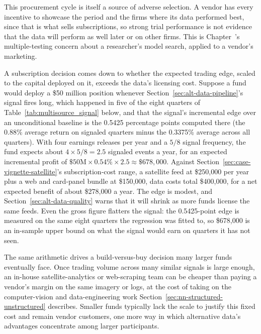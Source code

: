 \documentclass[../ai_in_finance]{subfiles}
\begin{document}
This procurement cycle is itself a source of adverse selection. A vendor has every incentive to showcase the period and the firms where its data performed best, since that is what sells subscriptions, so strong trial performance is not evidence that the data will perform as well later or on other firms. This is Chapter~'s multiple-testing concern about a researcher's model search, applied to a vendor's marketing.

A subscription decision comes down to whether the expected trading edge, scaled to the capital deployed on it, exceeds the data's licensing cost. Suppose a fund would deploy a \$50 million position whenever Section~\ref{sec:alt-data-pipeline}'s signal fires long, which happened in five of the eight quarters of Table~\ref{tab:multisource_signal} below, and that the signal's incremental edge over an unconditional baseline is the 0.5425 percentage points computed there (the 0.88\% average return on signaled quarters minus the 0.3375\% average across all quarters). With four earnings releases per year and a $5/8$ signal frequency, the fund expects about $4 \times 5/8 = 2.5$ signaled events a year, for an expected incremental profit of $\$50\text{M} \times 0.54\% \times 2.5 \approx \$678{,}000$. Against Section~\ref{sec:case-vignette-satellite}'s subscription-cost range, a satellite feed at \$250,000 per year plus a web and card-panel bundle at \$150,000, data costs total \$400,000, for a net expected benefit of about \$278,000 a year. The edge is modest, and Section~\ref{sec:alt-data-quality} warns that it will shrink as more funds license the same feeds. Even the gross figure flatters the signal: the 0.5425-point edge is measured on the same eight quarters the regression was fitted to, so \$678,000 is an in-sample upper bound on what the signal would earn on quarters it has not seen.

The same arithmetic drives a build-versus-buy decision many larger funds eventually face. Once trading volume across many similar signals is large enough, an in-house satellite-analytics or web-scraping team can be cheaper than paying a vendor's margin on the same imagery or logs, at the cost of taking on the computer-vision and data-engineering work Section~\ref{sec:nn-structured-unstructured} describes. Smaller funds typically lack the scale to justify this fixed cost and remain vendor customers, one more way in which alternative data's advantages concentrate among larger participants.

\label{sec:satellite-example}
\end{document}
